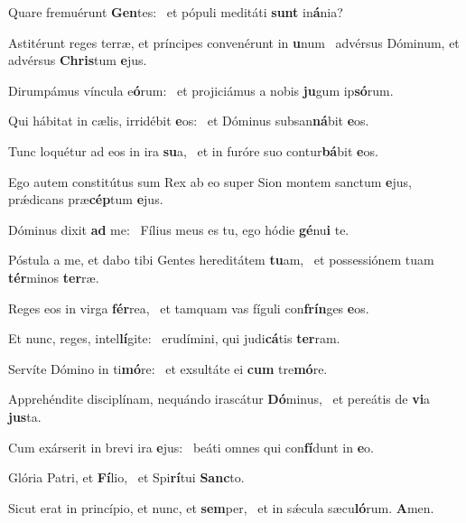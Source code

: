 \item Quare fremuérunt \textbf{Gen}tes:~\psstar{} et pópuli meditáti \textbf{sunt} in\textbf{á}nia?
\item Astitérunt reges terræ, et príncipes convenérunt in \textbf{u}num~\psstar{} advérsus Dóminum, et advérsus \textbf{Chris}tum \textbf{e}jus.
\item Dirumpámus víncula e\textbf{ó}rum:~\psstar{} et projiciámus a nobis \textbf{ju}gum ip\textbf{só}rum.
\item Qui hábitat in cælis, irridébit \textbf{e}os:~\psstar{} et Dóminus subsan\textbf{ná}bit \textbf{e}os.
\item Tunc loquétur ad eos in ira \textbf{su}a,~\psstar{} et in furóre suo contur\textbf{bá}bit \textbf{e}os.
\item Ego autem constitútus sum Rex ab eo super Sion montem sanctum \textbf{e}jus,~\psstar{} prǽdicans præ\textbf{cép}tum \textbf{e}jus.
\item Dóminus dixit \textbf{ad} me:~\psstar{} Fílius meus es tu, ego hódie \textbf{gé}nu\textbf{i} te.
\item Póstula a me, et dabo tibi Gentes hereditátem \textbf{tu}am,~\psstar{} et possessiónem tuam \textbf{tér}minos \textbf{ter}ræ.
\item Reges eos in virga \textbf{fér}rea,~\psstar{} et tamquam vas fíguli con\textbf{frín}ges \textbf{e}os.
\item Et nunc, reges, intel\textbf{lí}gite:~\psstar{} erudímini, qui judi\textbf{cá}tis \textbf{ter}ram.
\item Servíte Dómino in ti\textbf{mó}re:~\psstar{} et exsultáte ei \textbf{cum} tre\textbf{mó}re.
\item Apprehéndite disciplínam, nequándo irascátur \textbf{Dó}minus,~\psstar{} et pereátis de \textbf{vi}a \textbf{jus}ta.
\item Cum exárserit in brevi ira \textbf{e}jus:~\psstar{} beáti omnes qui con\textbf{fí}dunt in \textbf{e}o.
\item Glória Patri, et \textbf{Fí}lio,~\psstar{} et Spi\textbf{rí}tui \textbf{Sanc}to.
\item Sicut erat in princípio, et nunc, et \textbf{sem}per,~\psstar{} et in sǽcula sæcu\textbf{ló}rum. \textbf{A}men.
